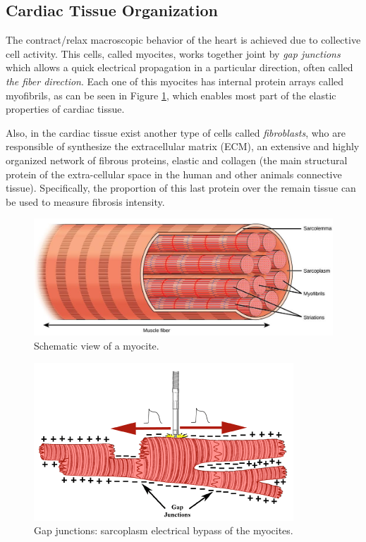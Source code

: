 \subsection{Cardiac Tissue Organization} \label{Cardiac_Tissue_Organization}

The contract/relax macroscopic behavior of the heart is achieved due to collective cell activity. This cells, called myocites, works together joint by \textsl{gap junctions} which allows a quick electrical propagation in a particular direction, often called \textsl{the fiber direction}. Each one of this myocites has internal protein arrays called myofibrils, as can be seen in Figure \ref{fig:myocite}, which enables most part of the elastic properties of cardiac tissue.

Also, in the cardiac tissue exist another type of cells called \textsl{fibroblasts}, who are responsible of synthesize the extracellular matrix (ECM), an extensive and highly organized network of fibrous proteins, elastic and collagen (the main structural protein of the extra-cellular space in the human and other animals connective tissue). Specifically, the proportion of this last protein over the remain tissue can be used to measure fibrosis intensity.

\begin{figure}[!htbp]
	\centering
	\includegraphics[height = 4 cm]{fig/fundamentals-myocites}
    \caption{Schematic view of a myocite.} 
    \label{fig:myocite}
\end{figure}

\begin{figure}[!htbp]
	\centering
    \includegraphics[height = 5 cm]{fig/fundamentals-gap_junctions} 
    \caption{Gap junctions: sarcoplasm electrical bypass of the myocites.}
    \label{fig:gap_junctions}
\end{figure}


